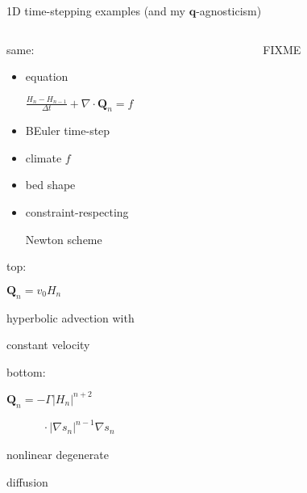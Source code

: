 \documentclass{beamer}
\newcommand\bq{\mathbf{q}}
\newcommand\bQ{\mathbf{Q}}
\newcommand{\Div}{\nabla\cdot}
\newcommand{\grad}{\nabla}
\begin{document}
\begin{frame}{1D time-stepping examples (and my $\bq$-agnosticism)}

\begin{columns}
\begin{column}{0.35\textwidth}
\alert{same:}

\begin{itemize}
\scriptsize
\item equation

\tiny
\hspace{-10mm} $\frac{H_n-H_{n-1}}{\Delta t} + \Div\bQ_n = f$
\scriptsize

\item BEuler time-step
\item climate $f$
\item bed shape
\item constraint-respecting

Newton scheme
\end{itemize}

\vspace{2mm}

\alert{top:}

\scriptsize

\medskip
$\bQ_n = v_0 H_n$

hyperbolic advection with

constant velocity

\vspace{5mm}

\normalsize 

\alert{bottom:}

\scriptsize

\medskip
$\bQ_n = - \Gamma |H_n|^{n+2}$

$\phantom{bQ_n = }\, \cdot |\grad s_n|^{n-1} \grad s_n$

nonlinear degenerate

diffusion
\end{column}
\begin{column}{0.55\textwidth}

FIXME

\medskip
\end{column}
\end{columns}
\end{frame}
\end{document}
